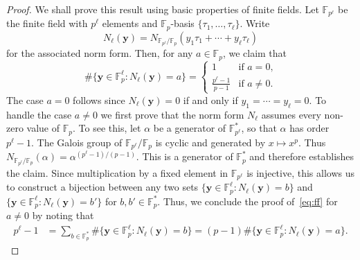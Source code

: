 \documentclass[11pt,letterpaper]{amsart}
\theoremstyle{definition}
\numberwithin{equation}{section}
\newcommand\FF{\mathbb{F}}
\newcommand{\y}{\mathbf{y}}
\newcommand{\0}{\mathbf{0}}
\begin{document}
\begin{proof}
We shall prove this result using basic properties of finite fields. 
Let $\FF_{p^\ell}$ be the finite field with $p^\ell$ elements and 
$\FF_p$-basis $\{\tau_1,\dots,\tau_\ell\}$.
Write 
$$N_\ell(\y)=N_{\FF_{p^\ell}/\FF_p}(y_1\tau_1+\cdots +y_\ell\tau_\ell)$$ 
for the associated norm form.
Then, for any $a\in \FF_p$, we claim that
\begin{equation}\label{eq:ff}
\#\{\y\in \FF_p^\ell:  N_\ell(\y)=a\}=\begin{cases}
1 & \mbox{if $a=0$,}\\
\frac{p^\ell-1}{p-1} & \mbox{if $a\neq 0$.}
\end{cases}
\end{equation}
The case $a=0$ follows since $N_{\ell}(\y)=0$ if and
only if $y_1=\cdots=y_\ell=0$. To handle the case $a\neq 0$ we first prove that the norm form $N_\ell$ assumes every non-zero value of $\FF_p$. 
To see this, let $\alpha$ be a generator of $\FF_{p^\ell}^*$,
so that  $\alpha$ has order $p^{\ell}-1$.
The Galois group of $\FF_{p^\ell}/\FF_p$ is cyclic and generated by
$x\mapsto x^p$.
Thus
$N_{\FF_{p^\ell}/\FF_p}(\alpha) = \alpha^{(p^{\ell}-1)/(p-1)}$. 
This  is a generator of $\FF_p^*$ and therefore establishes the
claim.
Since multiplication by a fixed element in $\FF_{p^{\ell}}$ is injective,
this allows us to construct a bijection between any two sets
$\{\y\in \FF_p^\ell:  N_\ell(\y)=b\}$ and
$\{\y\in \FF_p^\ell:  N_\ell(\y)=b'\}$ for $b,b' \in \FF_p^*$.
Thus, we conclude the proof of~\eqref{eq:ff} for $a\neq 0$ by noting that 
\begin{align*} 
p^\ell-1 
&=\sum_{b\in \FF_p^*}
\#\{\y\in \FF_p^\ell:  N_\ell(\y)=b\} 
=(p-1)
\#\{\y\in \FF_p^\ell:  N_\ell(\y)=a\}.
\end{align*}


\end{proof}
\end{document}
